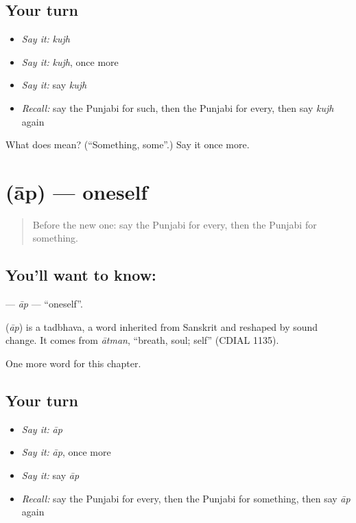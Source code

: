 \subsection*{Your turn}
\begin{itemize}
\raggedright
  \item \emph{Say it:} \emph{kujh}
  \item \emph{Say it:} \emph{kujh}, once more
  \item \emph{Say it:} say \emph{kujh}
  \item \emph{Recall:} say the Punjabi for such, then the Punjabi for every, then say \emph{kujh} again
\end{itemize}

\begin{tcolorbox}[breakable,colback=teal!4,colframe=teal!35!black,title={Before you move on}]
What does  mean? (\textquotedblleft{}Something, some\textquotedblright{}.) Say it once more.
\end{tcolorbox}
\section[\texorpdfstring{\pa{ਆਪ} (āp)}{ਆਪ (āp)}]{ (āp) — oneself}

\label{lesson:PA-C107-ap}



\begin{quote}
Before the new one: say the Punjabi for every, then the Punjabi for something.
\end{quote}

\subsection*{You'll want to know: }
\textbf{} — \emph{āp} — \textquotedblleft{}oneself\textquotedblright{}.

\begin{cousinweb}
\textbf{} (\emph{āp}) is a tadbhava, a word inherited from Sanskrit and reshaped by sound change. It comes from \emph{ātman}, \textquotedblleft{}breath, soul; self\textquotedblright{} (CDIAL 1135).
\end{cousinweb}

\begin{grammarlens}[title={What you've built}]
One more word for this chapter.
\end{grammarlens}

\subsection*{Your turn}
\begin{itemize}
\raggedright
  \item \emph{Say it:} \emph{āp}
  \item \emph{Say it:} \emph{āp}, once more
  \item \emph{Say it:} say \emph{āp}
  \item \emph{Recall:} say the Punjabi for every, then the Punjabi for something, then say \emph{āp} again
\end{itemize}

